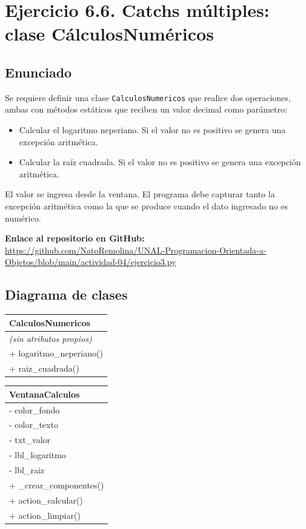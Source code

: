 \documentclass[11pt, a4paper]{article}
\newcommand{\clasebox}[3]{%
\begin{center}
\begin{tabular}{|l|}
\hline
\textbf{#1} \\
\hline
#2
\hline
#3
\hline
\end{tabular}
\end{center}
}
\begin{document}
\newpage
\section{Ejercicio 6.6. Catchs múltiples: clase CálculosNuméricos}

\subsection{Enunciado}
Se requiere definir una clase \texttt{CalculosNumericos} que realice dos operaciones, ambas
con métodos estáticos que reciben un valor decimal como parámetro:

\begin{itemize}
    \item Calcular el logaritmo neperiano. Si el valor no es positivo se genera una excepción
          aritmética.
    \item Calcular la raíz cuadrada. Si el valor no es positivo se genera una excepción
          aritmética.
\end{itemize}

\noindent El valor se ingresa desde la ventana. El programa debe capturar tanto la excepción
aritmética como la que se produce cuando el dato ingresado no es numérico.

\noindent \textbf{Enlace al repositorio en GitHub:} \\
\url{https://github.com/NatoRemolina/UNAL-Programacion-Orientada-a-Objetos/blob/main/actividad-04/ejercicio3.py}

\subsection{Diagrama de clases}
\clasebox{CalculosNumericos}
{%
\textit{(sin atributos propios)} \\
}
{%
+ logaritmo\_neperiano() \\
+ raiz\_cuadrada() \\
}

\clasebox{VentanaCalculos}
{%
- color\_fondo \\
- color\_texto \\
- txt\_valor \\
- lbl\_logaritmo \\
- lbl\_raiz \\
}
{%
+ \_crear\_componentes() \\
+ action\_calcular() \\
+ action\_limpiar() \\
}
\end{document}
